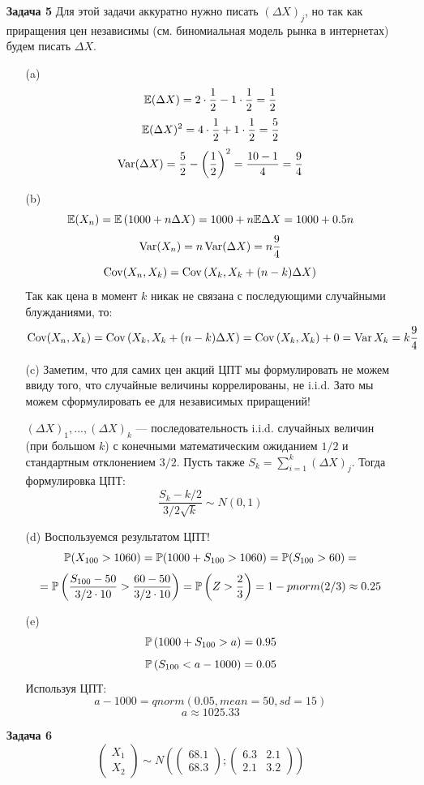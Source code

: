 \documentclass[12pt, a4paper]{article}\usepackage[]{graphicx}\usepackage[]{color}
\begin{document}
\begin{enumerate}
\item[\textbf{Задача 5}]
Для этой задачи аккуратно нужно писать \( \left(\Delta X \right)_j \), но так как приращения цен независимы (см. биномиальная модель рынка в интернетах) будем писать \( \Delta X \).
\begin{itemize}
\item[(a)] \[\E (\Delta X) = 2 \cdot \dfrac{1}{2} - 1 \cdot \dfrac{1}{2} = \dfrac{1}{2} \]
\[\E (\Delta X)^2 = 4 \cdot \dfrac{1}{2} + 1 \cdot \dfrac{1}{2} = \dfrac{5}{2} \]
\[\Var (\Delta X) = \dfrac{5}{2} - \left(\dfrac{1}{2}\right)^2 = \dfrac{10-1}{4}=\dfrac{9}{4} \]
\item[(b)] \[\E (X_n) = \E \left(1000 + n\Delta X \right)  = 1000 + n \E \Delta X = 1000 + 0.5 n     \]
\[ \Var (X_n) = n \Var (\Delta X) = n \dfrac{9}{4}  \]
\[ \Cov (X_n, X_k) = \Cov \left(X_k, X_k + (n-k) \Delta X \right)     \]
Так как цена в момент $k$ никак не связана с последующими случайными блужданиями, то:
\[ \Cov (X_n, X_k) = \Cov \left(X_k, X_k + (n-k) \Delta X \right) =  \Cov \left(X_k, X_k \right) + 0 = \Var X_k = k \dfrac{9}{4}    \]
\item[(c)] Заметим, что для самих цен акций ЦПТ мы формулировать не можем ввиду того, что случайные величины коррелированы, не i.i.d. Зато мы можем сформулировать ее для независимых приращений!

\( \left(\Delta X \right)_1, ..., \left(\Delta X \right)_{k} \) — последовательность i.i.d. случайных величин (при большом $k$) с конечными математическим ожиданием \(1/2 \) и стандартным отклонением \(3/2 \). Пусть также \( S_k = \sum_{i=1}^k \left(\Delta X \right)_j \). Тогда формулировка ЦПТ:
\[ \dfrac{S_k - k/2}{3/2 \sqrt{k}} \sim N(0,1)    \]
\item[(d)] Воспользуемся результатом ЦПТ!
\[\P(X_{100} > 1060) = \P (1000 + S_{100} > 1060) = \P(S_{100} >60) = \]
\[ = \P \left(\dfrac{S_{100} -50 }{3/2\cdot 10} > \dfrac{60-50}{3/2 \cdot 10}\right) = \P \left(Z > \dfrac{2}{3}\right) = 1-pnorm(2/3) \approx 0.25   \]

\item[(e)] \[ \P \left(1000 + S_{100} > a \right) = 0.95              \]
\[ \P \left( S_{100} < a-1000 \right) = 0.05              \]
Используя ЦПТ:
\[ a-1000 = qnorm(0.05, mean = 50, sd = 15 )            \]
\[ a \approx 1025.33   \]
\end{itemize}

\item[\textbf{Задача 6}]
$$\begin{pmatrix}
X_1 \\
X_2
\end{pmatrix} \sim N \left( \begin{pmatrix}
68.1 \\
68.3
\end{pmatrix} ; \begin{pmatrix}
6.3 & 2.1 \\
2.1 & 3.2
\end{pmatrix}                   \right)$$


\end{enumerate}
\end{document}
